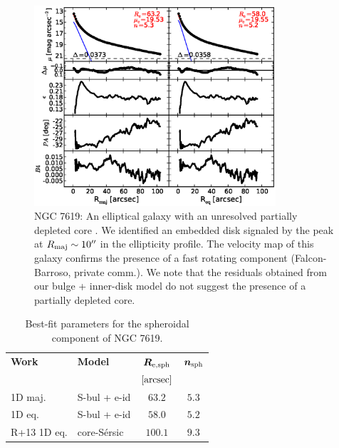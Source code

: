 \documentclass[preprint2]{emulateapj}
\newcommand{\fitfigurewidth}{0.8\textwidth}
\begin{document}
  \begin{figure}[h]
  \begin{center}
  \includegraphics[width=\fitfigurewidth]{images/n7619_1Dfit.eps}
  \caption{NGC 7619: 
  An elliptical galaxy with an unresolved partially depleted core \citep{rusli2013}. %
  We identified an embedded disk signaled by the peak at $R_{\rm maj} \sim 10''$ in the ellipticity profile.
  The velocity map of this galaxy confirms the presence of a fast rotating component (Falcon-Barroso, private comm.).
  We note that the residuals obtained from our bulge + inner-disk model do not suggest the presence of a partially depleted core.
  }
  \label{fig:n7619}
  \end{center}
  \end{figure}

  \begin{table}[h]
  \small
  \caption{Best-fit parameters for the spheroidal component of NGC 7619.}
  \begin{center}
  \begin{tabular}{llcc}
  \hline
  {\bf Work} & {\bf Model}   & $\bm R_{\rm e,sph}$    & $\bm n_{\rm sph}$ \\
    &  &  $[\rm arcsec]$ & \\
  \hline
  1D maj. & S-bul + e-id & $63.2$  &  $5.3$ \\
  1D eq.  & S-bul + e-id & $58.0$  &  $5.2$ \\
  \hline
  R+13 1D eq.      & core-S\'ersic & $100.1$  &  $9.3$ \\
  \hline
  \end{tabular}
  \end{center}
  \label{tab:n7619}
  \end{table}
\end{document}

